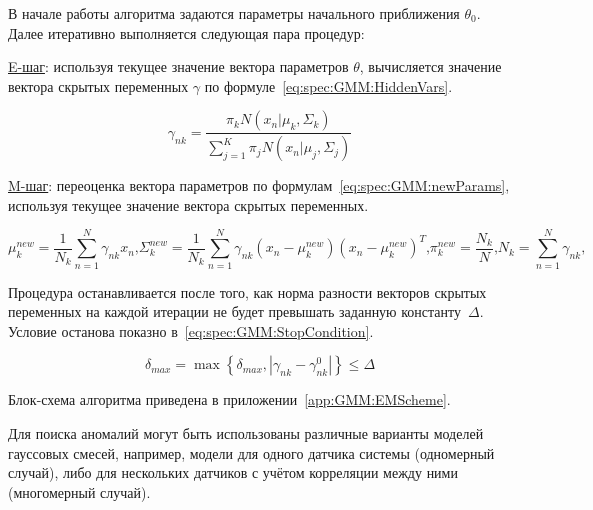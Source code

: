 В начале работы алгоритма задаются параметры начального приближения $\theta_0$. Далее итеративно выполняется следующая пара процедур:

\uline{E-шаг}: используя текущее значение вектора параметров $\theta$, вычисляется значение вектора скрытых переменных $\gamma$ по формуле~\eqref{eq:spec:GMM:HiddenVars}.

\begin{equation} \label{eq:spec:GMM:HiddenVars}
\gamma_{nk} = \frac{\pi_k N(x_n|\mu_k,\Sigma_k)}{\sum_{j=1}^{K} \pi_j N(x_n|\mu_j,\Sigma_j)}
\end{equation}

\uline{M-шаг}: переоценка вектора параметров по формулам~\eqref{eq:spec:GMM:newParams}, используя текущее значение вектора скрытых переменных.

\begin{subequations} \label{eq:spec:GMM:newParams}
\begin{equation} %
\mu_k^{new} = \frac{1}{N_k} \sum_{n=1}^{N} \gamma_{nk} x_n \text{,}
\end{equation}
\begin{equation} %
\Sigma_k^{new} = \frac{1}{N_k} \sum_{n=1}^{N} \gamma_{nk} (x_n - \mu_k^{new})(x_n-\mu_k^{new})^T \text{,}
\end{equation}
\begin{equation} %
\pi_k^{new} = \frac{N_k}{N} \text{,}
\end{equation}
\begin{equation} %
N_k = \sum_{n=1}^{N} \gamma_{nk} \text{,}
\end{equation}
\end{subequations}

Процедура останавливается после того, как норма разности векторов скрытых переменных на каждой итерации не будет превышать заданную константу~$\Delta$. Условие останова показно в~\eqref{eq:spec:GMM:StopCondition}.

\begin{equation} \label{eq:spec:GMM:StopCondition}
\delta_{max} = \max \left\{\delta_{max},|\gamma_{nk} - \gamma_{nk}^0|\right\} \leq\Delta
\end{equation}

Блок-схема алгоритма приведена в приложении~\ref{app:GMM:EMScheme}.

Для поиска аномалий могут быть использованы различные варианты моделей гауссовых смесей, например, модели для одного датчика системы (одномерный случай), либо для нескольких датчиков с учётом корреляции между ними (многомерный случай).

